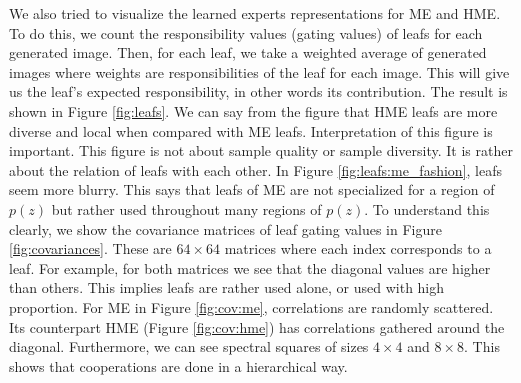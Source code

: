 \documentclass[a4paper,onesided,12pt]{report}
\begin{document}
We also tried to visualize the learned experts representations for ME and HME. To do this, we count the responsibility values (gating values) of leafs for each generated image. Then, for each leaf, we take a weighted average of generated images where weights are responsibilities of the leaf for each image. This will give us the leaf's expected responsibility, in other words its contribution. The result is shown in Figure \ref{fig:leafs}. We can say from the figure that HME leafs are more diverse and local when compared with ME leafs. Interpretation of this figure is important. This figure is not about sample quality or sample diversity. It is rather about the relation of leafs with each other. In Figure \ref{fig:leafs:me_fashion}, leafs seem more blurry. This says that leafs of ME are not specialized for a region of $p(z)$ but rather used throughout many regions of $p(z)$. To understand this clearly, we show the covariance matrices of leaf gating values in Figure \ref{fig:covariances}. These are $64 \times 64$ matrices where each index corresponds to a leaf. For example, for both matrices we see that the diagonal values are higher than others. This implies leafs are rather used alone, or used with high proportion. For ME in Figure \ref{fig:cov:me}, correlations are randomly scattered. Its counterpart HME (Figure \ref{fig:cov:hme}) has correlations gathered around the diagonal. Furthermore, we can see spectral squares of sizes $4 \times 4$ and $8 \times 8$. This shows that cooperations are done in a hierarchical way.
\end{document}
